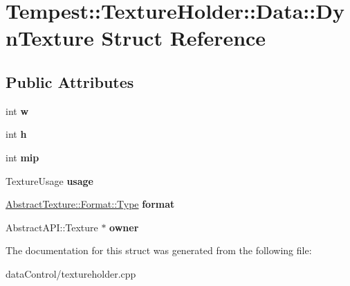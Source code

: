 \hypertarget{struct_texture_holder_1_1_data_1_1_dyn_texture}{\section{Tempest\+:\+:Texture\+Holder\+:\+:Data\+:\+:Dyn\+Texture Struct Reference}
\label{struct_texture_holder_1_1_data_1_1_dyn_texture}
}
\subsection*{Public Attributes}
\begin{DoxyCompactItemize}
\item 
\hypertarget{struct_texture_holder_1_1_data_1_1_dyn_texture_aeb39e4e5f7a3979c3c151be06dc26841}{int {\bfseries w}}\label{struct_texture_holder_1_1_data_1_1_dyn_texture_aeb39e4e5f7a3979c3c151be06dc26841}

\item 
\hypertarget{struct_texture_holder_1_1_data_1_1_dyn_texture_a0e3ae67efcba86b99c7491ab23795ea4}{int {\bfseries h}}\label{struct_texture_holder_1_1_data_1_1_dyn_texture_a0e3ae67efcba86b99c7491ab23795ea4}

\item 
\hypertarget{struct_texture_holder_1_1_data_1_1_dyn_texture_a9691dc68de9e199343c07d316ca6138b}{int {\bfseries mip}}\label{struct_texture_holder_1_1_data_1_1_dyn_texture_a9691dc68de9e199343c07d316ca6138b}

\item 
\hypertarget{struct_texture_holder_1_1_data_1_1_dyn_texture_a23b34b352042dd38aeafcfcc732a2294}{Texture\+Usage {\bfseries usage}}\label{struct_texture_holder_1_1_data_1_1_dyn_texture_a23b34b352042dd38aeafcfcc732a2294}

\item 
\hypertarget{struct_texture_holder_1_1_data_1_1_dyn_texture_a542bf3f85322b413a3ec861dfbfdd4dd}{\hyperlink{struct_tempest_1_1_abstract_texture_1_1_format_a231a1f516e53783bf72c713669b115b3}{Abstract\+Texture\+::\+Format\+::\+Type} {\bfseries format}}\label{struct_texture_holder_1_1_data_1_1_dyn_texture_a542bf3f85322b413a3ec861dfbfdd4dd}

\item 
\hypertarget{struct_texture_holder_1_1_data_1_1_dyn_texture_ac7fb289a465cc6b2b558b62aca5d940c}{Abstract\+A\+P\+I\+::\+Texture $\ast$ {\bfseries owner}}\label{struct_texture_holder_1_1_data_1_1_dyn_texture_ac7fb289a465cc6b2b558b62aca5d940c}

\end{DoxyCompactItemize}


The documentation for this struct was generated from the following file\+:\begin{DoxyCompactItemize}
\item 
data\+Control/textureholder.\+cpp\end{DoxyCompactItemize}
